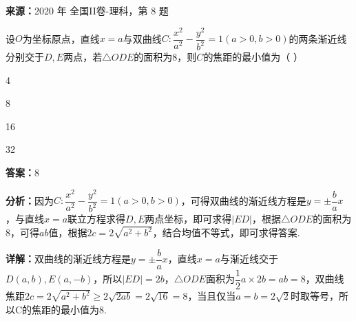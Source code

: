 \begin{question}[points=5]
\textbf{来源：}2020 年 全国II卷-理科，第 8 题\par
设$O$为坐标原点，直线$x=a$与双曲线$C:\dfrac{x^2}{a^2}-\dfrac{y^2}{b^2}=1(a>0,b>0)$的两条渐近线分别交于$D,E$两点，若$\triangle ODE$的面积为8，则$C$的焦距的最小值为（ ）
\begin{choices}
  \item 4
  \item 8
  \item 16
  \item 32
\end{choices}
\begin{solution}
\textbf{答案：}8

\textbf{分析：}因为$C:\dfrac{x^2}{a^2}-\dfrac{y^2}{b^2}=1(a>0,b>0)$，可得双曲线的渐近线方程是$y=\pm\dfrac{b}{a}x$，与直线$x=a$联立方程求得$D,E$两点坐标，即可求得$|ED|$，根据$\triangle ODE$的面积为8，可得$ab$值，根据$2c=2\sqrt{a^2+b^2}$，结合均值不等式，即可求得答案.

\textbf{详解：}双曲线的渐近线方程是$y=\pm\dfrac{b}{a}x$，直线$x=a$与渐近线交于$D(a,b),E(a,-b)$，所以$|ED|=2b$，$\triangle ODE$面积为$\dfrac{1}{2}a\times2b=ab=8$，双曲线焦距$2c=2\sqrt{a^2+b^2}\geq2\sqrt{2ab}=2\sqrt{16}=8$，当且仅当$a=b=2\sqrt2$时取等号，所以C的焦距的最小值为8.
\end{solution}
\end{question}


